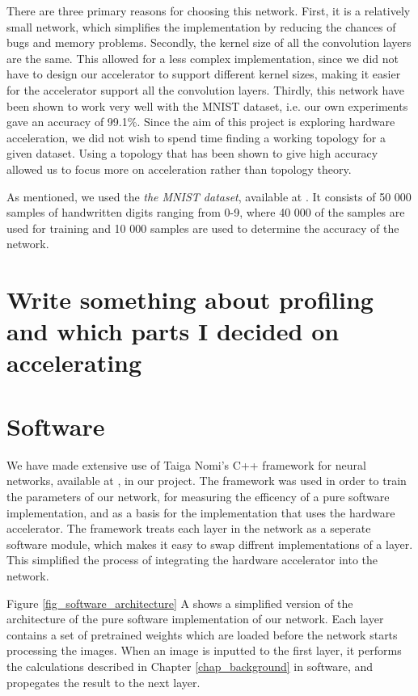 There are three primary reasons for choosing this network. First, it is a relatively small network, which simplifies the implementation by reducing the chances of bugs and memory problems. Secondly, the kernel size of all the convolution layers are the same. This allowed for a less complex implementation, since we did not have to design our accelerator to support different kernel sizes, making it easier for the accelerator support all the convolution layers. Thirdly, this network have been shown to work very well with the MNIST dataset, i.e. our own experiments gave an accuracy of 99.1\%. Since the aim of this project is exploring hardware acceleration, we did not wish to spend time finding a working topology for a given dataset. Using a topology that has been shown to give high accuracy allowed us to focus more on acceleration rather than topology theory.   

 As mentioned, we used the \textit{the MNIST dataset}, available at \cite{MNIST}. It consists of 50 000 samples of handwritten digits ranging from 0-9, where 40 000 of the samples are used for
training and 10 000 samples are used to determine the accuracy of the network. 

\section{Write something about profiling and which parts I decided on accelerating}

\section{Software}

We have made extensive use of Taiga Nomi's C++ framework for neural networks, available at \cite{SoftwareGithub}, in our project. The framework was used in order to train the parameters of our network, for measuring the efficency of a pure software implementation, and as a basis for the implementation that uses the hardware accelerator. The framework treats each layer in the network as a seperate software module, which makes it easy to swap diffrent implementations of a layer. This simplified the process of integrating the hardware accelerator into the network.

Figure \ref{fig_software_architecture} A shows a simplified version of the architecture of the pure software implementation of our network. Each layer contains a set of pretrained weights which are loaded before the network starts processing the images. When an image is inputted to the first layer, it performs the calculations described in Chapter \ref{chap_background} in software, and propegates the result to the next layer. 

